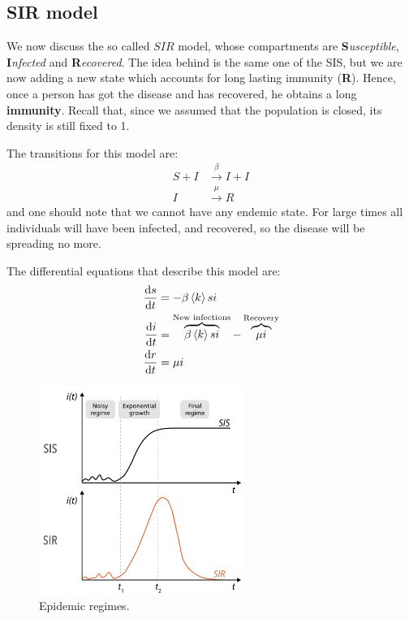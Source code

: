 \documentclass[../main/main.tex]{subfiles}
\begin{document}
\subsection{SIR model}
We now discuss the so called $SIR$ model, whose compartments are \textbf{S}\textit{usceptible}, \textbf{I}\textit{nfected} and \textbf{R}\textit{ecovered}. The idea behind is the same one of the SIS, but we are now adding a new state which accounts for long lasting immunity (\textbf{R}). Hence, once a person has got the disease and has recovered, he obtains a long \textbf{immunity}. Recall that, since we assumed that the population is closed, its density is still fixed to 1.

The transitions for this model are:
\begin{equation}
\begin{split}
  S + I &\overset{\beta }{\rightarrow } I + I  \\
  I &\overset{\mu }{\rightarrow } R
\end{split}
\end{equation}
and one should note that we cannot have any endemic state. For large times all individuals will have been infected, and recovered, so the disease will be spreading no more.

The differential equations that describe this model are:
\begin{equation}
\begin{split}
  \dv{s}{t} &= - \beta \expval{k} si  \\
  \dv{i}{t} &= \overbrace{\beta \expval{k} si}^{\text{New infections}}  - \overbrace{\mu i}^{\text{Recovery}} \\
  \dv{r}{t} &= \mu i
\end{split}
\end{equation}

\begin{figure}[h!]
\centering
\includegraphics[width=0.6\textwidth]{../lessons/image/03/6.png}
\caption{\label{fig:3_6} Epidemic regimes.}
\end{figure}
\end{document}
